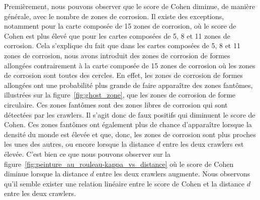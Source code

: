 \documentclass[francais,RandD]{rapportPFE}
\begin{document}
			Premièrement, nous pouvons observer que le score de Cohen diminue, de manière générale, avec le nombre de zones de corrosion.
			Il existe des exceptions, notamment pour la carte composée de 15 zones de corrosion, où le score de Cohen est plus élevé que pour les cartes composées de 5, 8 et 11 zones de corrosion.
			Cela s'explique du fait que dans les cartes composées de 5, 8 et 11 zones de corrosion, nous avons introduit des zones de corrosion de formes allongées contrairement à la carte composée de 15 zones de corrosion où les zones de corrosion sont toutes des cercles.
			En effet, les zones de corrosion de formes allongées ont une probabilité plus grande de faire apparaître des zones fantômes, illustrées sur la figure~\ref{fig:ghost_zone}, que les zones de corrosion de forme circulaire.
			Ces zones fantômes sont des zones libres de corrosion qui sont détectées par les crawlers.
			Il s'agit donc de faux positifs qui diminuent le score de Cohen.
			Ces zones fantômes ont également plus de chance d'apparaître lorsque la densité du monde est élevée et que, donc, les zones de corrosion sont plus proches les unes des autres, ou encore lorsque la distance $d$ entre les deux crawlers est élevée.
			C'est bien ce que nous pouvons observer sur la figure~\ref{fig:peinture_au_rouleau-kappa_vs_distance} où le score de Cohen diminue lorsque la distance $d$ entre les deux crawlers augmente.
			Nous observons qu'il semble exister une relation linéaire entre le score de Cohen et la distance $d$ entre les deux crawlers.
\end{document}
